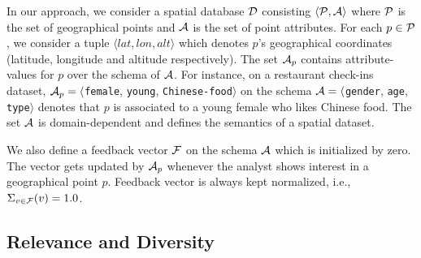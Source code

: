 \documentclass[conference,compsoc]{IEEEtran}
\newtheorem{example}{Example}
\newcommand{\framework}{{\sc GeoGuide}}
\begin{document}



In our approach, we consider a spatial database ${\cal D}$ consisting $\langle {\cal P}, {\cal A} \rangle$ where ${\cal P}$ is the set of
geographical points and ${\cal A}$ is the set of point attributes. For each $p \in {\cal P}$, we consider a tuple $\langle lat, lon, alt\rangle$ which denotes $p$'s geographical coordinates (latitude, longitude and altitude respectively). The set ${\cal A}_p$ contains attribute-values for $p$ over the schema of ${\cal A}$. For instance, on a restaurant check-ins dataset, ${\cal A}_p = \langle${\tt female}, {\tt young}, {\tt Chinese-food}$\rangle$ on the schema ${\cal A} = \langle${\tt gender}, {\tt age}, {\tt type}$\rangle$ denotes that $p$ is associated to a young female who likes Chinese food. The set ${\cal A}$ is domain-dependent and defines the semantics of a spatial dataset.

We also define a feedback vector ${\cal F}$ on the schema ${\cal A}$ which is initialized by zero. The vector gets updated by ${\cal A}_p$ whenever the analyst shows interest in a geographical point $p$. Feedback vector is always kept normalized, i.e., $\Sigma_{v \in {\cal F}}(v) = 1.0$.

\subsection{Relevance and Diversity}
\end{document}
